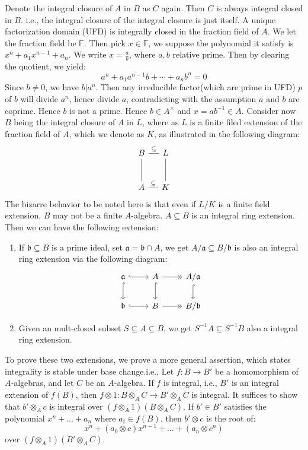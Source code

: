 \documentclass[12pt]{article}
\theoremstyle{definition}
\theoremstyle{plain}
\newcommand{\field}{\mathbb{F}}
\begin{document}
\Cor Denote the integral closure of $A$ in $B$ as $C$ again. Then $C$ is always integral closed in $B$. i.e., the integral closure of the integral closure is just itself.
\Prop A unique factorization domain (UFD) is integrally closed in the fraction field of $A$.
\proof We let the fraction field be $\field$. Then pick $x\in \field$, we suppose the polynomial it satisfy is $x^n+a_1x^{n-1}+a_n$. We write $x=\frac{a}{b}$, where $a, b$ relative prime. Then by clearing the quotient, we yield:
\[a^n+a_1a^{n-1}b+\cdots+a_nb^n=0\]
Since $b\neq 0$, we have $b|a^n$. Then any irreducible factor(which are prime in UFD) $p$ of $b$ will divide $a^n$, hence divide $a$, contradicting with the assumption $a$ and $b$ are coprime. Hence $b$ is not a prime. Hence $b\in A^\times$ and $x=ab^{-1}\in A$.
\Rmk Consider now $B$ being the integral closure of $A$ in $L$, where as $L$ is a finite filed extension of the fraction field of $A$, which we denote as $K$, as illustrated in the following diagram:
\begin{equation}
  \begin{tikzcd}[column sep=small, row sep=large]
    B\ar[-]{r}{\subseteq}\ar[-]{d}&L\ar[-]{d}\\
    A\ar[-]{r}{\subseteq} &K
  \end{tikzcd}
\end{equation}
The bizarre behavior to be noted here is that even if $L/K$ is a finite field extension, $B$ may not be a finite $A$-algebra.
 $A\subseteq B$ is an integral ring extension. Then we can have the following extension:
\begin{enumerate}
  \item If $\mathfrak{b}\subseteq B$ is a prime ideal, set $\mathfrak{a}=\mathfrak{b}\cap A$, we get $A/\mathfrak{a}\subseteq B/\mathfrak{b}$  is also an integral ring extension via the following diagram:
      \begin{equation}
        \begin{tikzcd}
          \mathfrak{a}\ar[hook]{r}\ar[hook]{d}&A\ar[hook]{d}\ar[->>]{r}&A/\mathfrak{a}\ar[hook]{d}\\
          \mathfrak{b}\ar[hook]{r}&B\ar[->>]{r} &B/\mathfrak{b}
        \end{tikzcd}
      \end{equation}
  \item Given an mult-closed subset $S\subseteq A\subseteq B$, we get $S^{-1}A\subseteq S^{-1}B$ also a integral ring extension.
\end{enumerate}
To prove these two extensions, we prove a more general assertion, which states integrality is stable under base change.i.e.,
\Lemma Let $f:B\to B'$ be a homomorphism of $A$-algebras, and let $C$ be an $A$-algebra. If $f$ is integral, i.e., $B'$ is an integral extension of $f(B)$, then $f\otimes 1:B\otimes_A C\to B'\otimes_A C$ is integral.
\proof It suffices to show that $b'\otimes_A c$ is integral over $(f\otimes_A 1)(B\otimes_A C)$. If $b'\in B'$ satisfies the polynomial $x^n+...+a_n$ where $a_i\in f(B)$, then $b'\otimes c$ is the root of:
\[x^n+(a_0\otimes c)x^{n-1}+...+(a_n\otimes c^n)\]
over $(f\otimes_A 1)(B'\otimes_A C)$.
\end{document}
